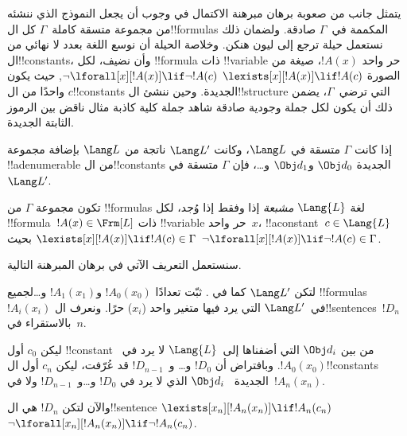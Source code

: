 \documentclass[../../../include/open-logic-section]{subfiles}
\begin{document}


\begin{explain}
يتمثل جانب من صعوبة برهان مبرهنة الاكتمال في وجوب أن يجعل النموذج الذي
ننشئه من مجموعة متسقة كاملة~$\Gamma$ كل ال!!{formula}s المكممة
في~$\Gamma$ صادقة. ولضمان ذلك نستعمل حيلة ترجع إلى ليون هنكن. وخلاصة
الحيلة أن نوسع اللغة بعدد لا نهائي من ال!!{constant}s، وأن نضيف، لكل
!!{formula} ذات !!{variable} حر واحد $!A(x)$، صيغة من الصورة
      {$\lexists[x][!A(x)] \lif !A(c)$}
      {$\lnot\lforall[x][!A(x)] \lif \lnot !A(c)$},
حيث يكون $c$ واحدًا من ال!!{constant}s الجديدة. وحين ننشئ ال!!{structure}
التي ترضي~$\Gamma$، يضمن ذلك أن يكون لكل
{جملة وجودية صادقة شاهد}
{جملة كلية كاذبة مثال ناقض}
بين الرموز الثابتة الجديدة.
\end{explain}

\begin{prop}
إذا كانت $\Gamma$ متسقة في $\Lang L$، وكانت $\Lang L'$ ناتجة من
$\Lang L$ بإضافة مجموعة !!a{denumerable} من ال!!{constant}s الجديدة
$\Obj d_0$ و$\Obj d_1$ و\dots، فإن $\Gamma$ متسقة في~$\Lang L'$.
\end{prop}

\begin{defn}
تكون مجموعة $\Gamma$ من !!{formula}s لغة $\Lang {L}$
\emph{مشبعة} إذا وفقط إذا وُجد، لكل !!{formula}~$!A(x) \in \Frm[L]$
ذات !!{variable} حر واحد~$x$، !!a{constant}~$c \in \Lang{L}$ بحيث
      {$\lexists[x][!A(x)] \lif !A(c) \in \Gamma$}
      {$\lnot\lforall[x][!A(x)] \lif \lnot !A(c) \in \Gamma$}.
\end{defn}

سنستعمل التعريف الآتي في برهان المبرهنة التالية.

\begin{defn}
لتكن $\Lang L'$ كما في . ثبّت تعدادًا
$!A_0(x_0)$ و$!A_1(x_1)$ و\dots لجميع !!{formula}s~$!A_i(x_i)$
في~$\Lang L'$ التي يرد فيها متغير واحد ($x_i$) حرًا. ونعرف
ال!!{sentence}s~$!D_n$ بالاستقراء في~$n$.

ليكن $c_0$ أول !!{constant} من بين $\Obj d_i$ التي أضفناها
إلى~$\Lang{L}$ لا يرد في~$!A_0(x_0)$. وبافتراض أن $!D_0$ و\dots
و~$!D_{n-1}$ قد عُرّفت، ليكن $c_n$ أول ال!!{constant}s الجديدة
~$\Obj d_i$ الذي لا يرد في $!D_0$ و\dots و~$!D_{n-1}$ ولا
في~$!A_n(x_n)$.

والآن لتكن $!D_{n}$ هي ال!!{sentence} 
{$\lexists[x_{n}][!A_{n}(x_{n})] \lif
  !A_{n}(c_{n})$}{$\lnot\lforall[x_{n}][!A_{n}(x_{n})] \lif \lnot
  !A_{n}(c_{n})$}.
\end{defn}
\end{document}
